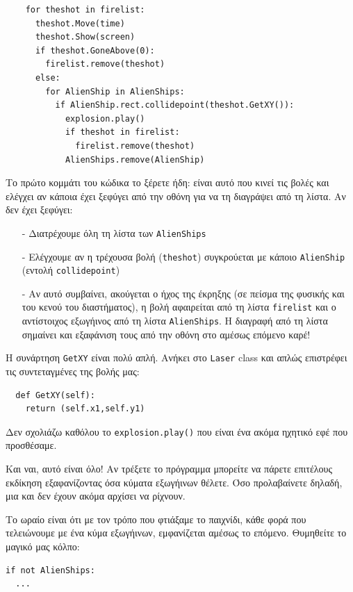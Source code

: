 \begin{verbatim}
    for theshot in firelist:
      theshot.Move(time)
      theshot.Show(screen)
      if theshot.GoneAbove(0):
        firelist.remove(theshot)
      else:
        for AlienShip in AlienShips:
          if AlienShip.rect.collidepoint(theshot.GetXY()):
            explosion.play()
            if theshot in firelist:
              firelist.remove(theshot)
            AlienShips.remove(AlienShip)
\end{verbatim}

Το πρώτο κομμάτι του κώδικα το ξέρετε ήδη: είναι αυτό που κινεί τις βολές και ελέγχει αν κάποια έχει ξεφύγει από την οθόνη για να τη διαγράψει από τη λίστα. Αν δεν έχει ξεφύγει:
%
\begin{itemize}
\item[-] Διατρέχουμε όλη τη λίστα των {\tt AlienShips}
\item[-] Ελέγχουμε αν η τρέχουσα βολή ({\tt theshot}) συγκρούεται με κάποιο {\tt AlienShip} (εντολή {\tt collidepoint})
\item[-] Αν αυτό συμβαίνει, ακούγεται ο ήχος της έκρηξης (σε πείσμα της φυσικής και του κενού του διαστήματος), η βολή αφαιρείται από τη λίστα {\tt firelist} και ο αντίστοιχος εξωγήινος από τη λίστα {\tt AlienShips}. H διαγραφή από τη λίστα σημαίνει και εξαφάνιση τους από την οθόνη στο αμέσως επόμενο καρέ!
\end{itemize}
%
Η συνάρτηση {\tt GetXY} είναι πολύ απλή. Ανήκει στο {\tt Laser} class και απλώς επιστρέφει τις συντεταγμένες της βολής μας:

\begin{verbatim}
  def GetXY(self):
    return (self.x1,self.y1)
\end{verbatim}

Δεν σχολιάζω καθόλου το {\tt explosion.play()} που είναι ένα ακόμα ηχητικό εφέ που προσθέσαμε.

Και ναι, αυτό είναι όλο! Αν τρέξετε το πρόγραμμα μπορείτε να πάρετε επιτέλους εκδίκηση εξαφανίζοντας όσα κύματα εξωγήινων θέλετε. Όσο προλαβαίνετε δηλαδή, μια και δεν έχουν ακόμα αρχίσει να ρίχνουν.

Το ωραίο είναι ότι με τον τρόπο που φτιάξαμε το παιχνίδι, κάθε φορά που τελειώνουμε με ένα κύμα εξωγήινων, εμφανίζεται αμέσως το επόμενο. Θυμηθείτε το μαγικό μας κόλπο:
%
\begin{verbatim}
if not AlienShips:
  ...
\end{verbatim}

